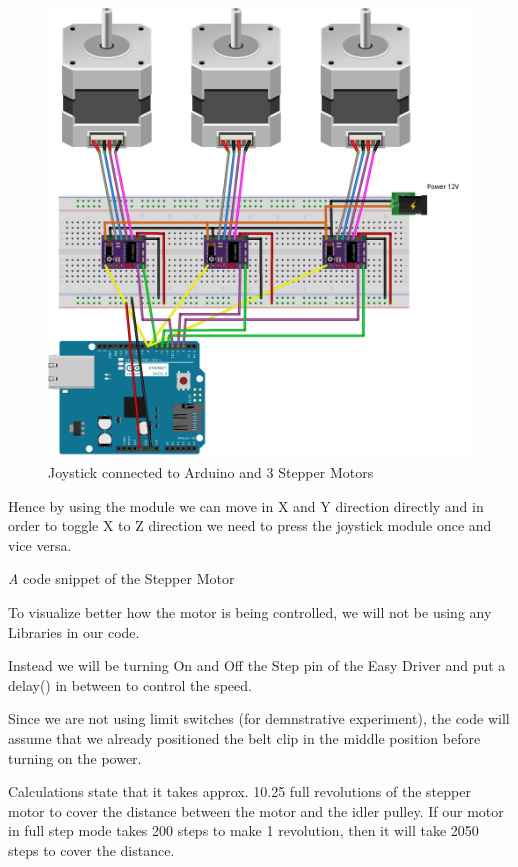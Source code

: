 \documentclass[MTech]{iitmdiss}
\begin{document}
	\begin{figure}[h]
		\includegraphics[width=\linewidth]{ffigures/joyardstp33}
		\centering
		\caption{Joystick connected to Arduino and 3 Stepper Motors }
		\label{fig:joyardstpp3}
	
	\end{figure}
	
	
Hence by using the module we can move in X and Y direction directly and in order to toggle X to Z direction we need to press the joystick module once and vice versa.

\emph A code snippet of the Stepper Motor

To visualize better how the motor is being controlled, we will not be using any Libraries in our code.

Instead we will be turning On and Off the Step pin of the Easy Driver and put a delay() in between to control the speed.

Since we are not using limit switches (for demnstrative experiment), the code will assume that we already positioned the belt clip in the middle position before turning on the power.

Calculations state that it takes approx. 10.25 full revolutions of the stepper motor to cover the distance between the motor and the idler pulley.  If our motor in full step mode takes 200 steps to make 1 revolution, then it will take 2050 steps to cover the distance.
\end{document}

